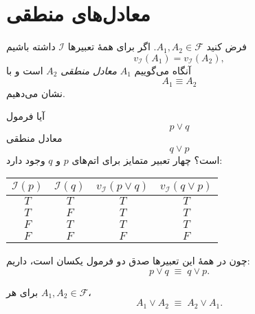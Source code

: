 \section*{ معادل‌های منطقی}
    \begin{definition}[تعریف \lr{2.26}]
      فرض کنید $A_1, A_2 \in \mathscr{F}$. اگر برای همهٔ تعبیرها $\mathscr{I}$ داشته باشیم
      \[
      v_{\mathscr{I}}(A_1) = v_{\mathscr{I}}(A_2),
      \]
      آنگاه می‌گوییم $A_1$ \emph{معادل منطقی} $A_2$ است و با
      \[
      A_1 \equiv A_2
      \]
      نشان می‌دهیم.
    \end{definition}
      
    \begin{example}[مثال \lr{2.27}]
      آیا فرمول
      \[
      p \lor q
      \]
      معادل منطقی
      \[
      q \lor p
      \]
      است؟ چهار تعبیر متمایز برای اتم‌های $p$ و $q$ وجود دارد:
      
      \begin{center}
      \begin{tabular}{|c|c|c|c|}
      \hline
      $\mathscr{I}(p)$ & $\mathscr{I}(q)$ & $v_{\mathscr{I}}(p \lor q)$ & $v_{\mathscr{I}}(q \lor p)$ \\
      \hline
      $T$ & $T$ & $T$ & $T$ \\
      $T$ & $F$ & $T$ & $T$ \\
      $F$ & $T$ & $T$ & $T$ \\
      $F$ & $F$ & $F$ & $F$ \\
      \hline
      \end{tabular}
      \end{center}
      
      چون در همهٔ این تعبیرها صدق دو فرمول یکسان است، داریم:
      \[
      p \lor q \;\equiv\; q \lor p.
      \]
    \end{example}
      
    \begin{theorem}[قضیه \lr{2.28}]
      برای هر $A_1, A_2 \in \mathscr{F}$،
      \[
      A_1 \lor A_2 \;\equiv\; A_2 \lor A_1.
      \]
    \end{theorem}
      
